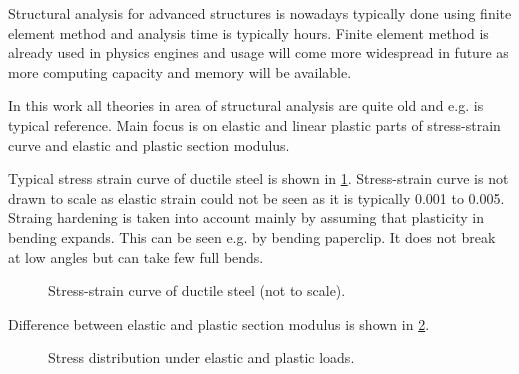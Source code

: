 Structural analysis for advanced structures is nowadays typically done using finite element method and 
analysis time is typically hours. Finite element method is already used in physics engines and usage will come 
more widespread in future as more computing capacity and memory will be available.

In this work all theories in area of structural analysis are quite old and e.g. 
\cite{timoshenko} is typical reference. Main focus is on elastic and 
linear plastic parts of stress-strain curve and elastic and plastic section modulus.

Typical stress strain curve of ductile steel is shown in \ref{fig:areas}.
Stress-strain curve is not drawn to scale as elastic strain could not be seen as it is typically 0.001 to 0.005.
Straing hardening is taken into account mainly by assuming that plasticity in bending expands.
This can be seen e.g. by bending paperclip. It does not break at low angles but can take few full bends. 

\begin{figure}[htb!]
\centering
{}
\caption{Stress-strain curve of ductile steel (not to scale).}
\label{fig:areas}
\end{figure}

Difference between elastic and plastic section modulus is shown in \ref{fig:wp}. 

\begin{figure}[htb!]
\centering
{}
\hspace{1cm}
\caption{Stress distribution under elastic and plastic loads.}
\label{fig:wp}
\end{figure}

